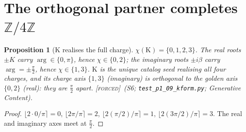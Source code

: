 \documentclass[11pt]{article}
\theoremstyle{plain}
\newtheorem{proposition}[theorem]{Proposition}
\theoremstyle{definition}
\theoremstyle{remark}
\newcommand{\forced}{\textup{\textcolor{forcedc}{\textsc{[forced]}}}}
\newcommand{\Z}{\mathbb{Z}}
\newcommand{\Kf}{\mathrm{K}}
\begin{document}
\section{The orthogonal partner completes $\Z/4\Z$}\label{sec:partner}

\begin{proposition}[$\Kf$ realises the full charge]\label{prop:fullcharge}
$\chi(\Kf)=\{0,1,2,3\}$. The real roots $\pm K$ carry $\arg\in\{0,\pi\}$, hence $\chi\in\{0,2\}$; the imaginary
roots $\pm i\beta$ carry $\arg=\pm\tfrac{\pi}{2}$, hence $\chi\in\{1,3\}$. $\Kf$ is the unique catalog seed
realising all four charges, and its charge axis $\{1,3\}$ (imaginary) is \emph{orthogonal} to the golden axis
$\{0,2\}$ (real): they are $\tfrac{\pi}{2}$ apart. \forced\ (S6; \texttt{test\_p1\_09\_kform.py}; \emph{Generative
Content}).
\end{proposition}
\begin{proof}
$\lfloor 2\cdot0/\pi\rceil=0$, $\lfloor 2\pi/\pi\rceil=2$, $\lfloor 2(\pi/2)/\pi\rceil=1$,
$\lfloor 2(3\pi/2)/\pi\rceil=3$. The real and imaginary axes meet at $\tfrac{\pi}{2}$.
\end{proof}
\end{document}
